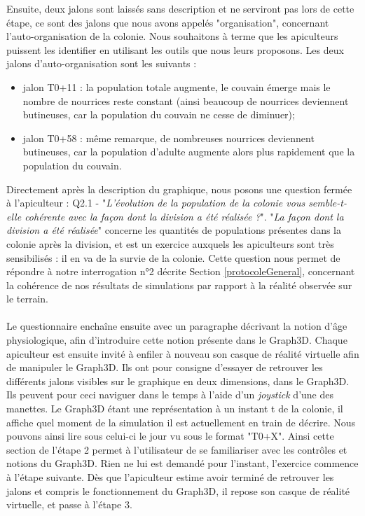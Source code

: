 		Ensuite, deux jalons sont laissés sans description et ne serviront pas lors de cette étape, ce sont des jalons que nous avons appelés "organisation", concernant l'auto-organisation de la colonie. Nous souhaitons à terme que les apiculteurs puissent les identifier en utilisant les outils que nous leurs proposons. Les deux jalons d'auto-organisation sont les suivants :
		\begin{itemize}
			\item jalon T0+11 : la population totale augmente, le couvain émerge mais le nombre de nourrices reste constant (ainsi beaucoup de nourrices deviennent butineuses, car la population du couvain ne cesse de diminuer);
			\item jalon T0+58 : même remarque, de nombreuses nourrices deviennent butineuses, car la population d'adulte augmente alors plus rapidement que la population du couvain.
		\end{itemize}
		
		Directement après la description du graphique, nous posons une question fermée à l'apiculteur : Q2.1 - "\textit{L'évolution de la population de la colonie vous semble-t-elle cohérente avec la façon dont la division a été réalisée ?}". "\textit{La façon dont la division a été réalisée}" concerne les quantités de populations présentes dans la colonie après la division, et est un exercice auxquels les apiculteurs sont très sensibilisés : il en va de la survie de la colonie. Cette question nous permet de répondre à notre interrogation n°2 décrite Section \ref{protocoleGeneral}, concernant la cohérence de nos résultats de simulations par rapport à la réalité observée sur le terrain.
		
		\paragraph{}
		Le questionnaire enchaîne ensuite avec un paragraphe décrivant la notion d'âge physiologique, afin d'introduire cette notion présente dans le Graph3D. Chaque apiculteur est ensuite invité à enfiler à nouveau son casque de réalité virtuelle afin de manipuler le Graph3D. Ils ont pour consigne d'essayer de retrouver les différents jalons visibles sur le graphique en deux dimensions, dans le Graph3D. Ils peuvent pour ceci naviguer dans le temps à l'aide d'un \textit{joystick} d'une des manettes. Le Graph3D étant une représentation à un instant t de la colonie, il affiche quel moment de la simulation il est actuellement en train de décrire. Nous pouvons ainsi lire sous celui-ci le jour vu sous le format "T0+X". Ainsi cette section de l'étape 2 permet à l'utilisateur de se familiariser avec les contrôles et notions du Graph3D. Rien ne lui est demandé pour l'instant, l'exercice commence à l'étape suivante. Dès que l'apiculteur estime avoir terminé de retrouver les jalons et compris le fonctionnement du Graph3D, il repose son casque de réalité virtuelle, et passe à l'étape 3.
		
